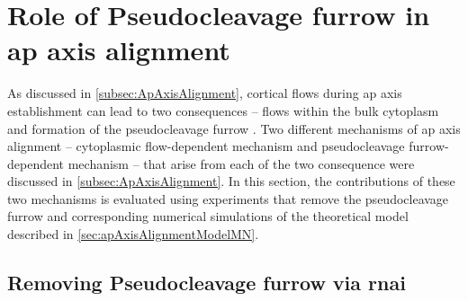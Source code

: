 \FloatBarrier
\section{Role of Pseudocleavage furrow in \acs{ap} axis alignment}\label{sec:PcFurrowRole}
As discussed in \autoref{subsec:ApAxisAlignment}, cortical flows during \ac{ap} axis establishment can lead to two consequences -- flows within the bulk cytoplasm \citep{niwayama2011hydrodynamic} and formation of the pseudocleavage furrow \citep{reymann2016cortical}. Two different mechanisms of \ac{ap} axis alignment -- cytoplasmic flow-dependent mechanism and pseudocleavage furrow-dependent mechanism -- that arise from each of the two consequence were discussed in \autoref{subsec:ApAxisAlignment}. In this section, the contributions of these two mechanisms is evaluated using experiments that remove the pseudocleavage furrow and corresponding numerical simulations of the theoretical model described in \autoref{sec:apAxisAlignmentModelMN}.

\subsection{Removing Pseudocleavage furrow via \acs{rnai}}\label{subsec:Nop1AndNop1Mel11}


